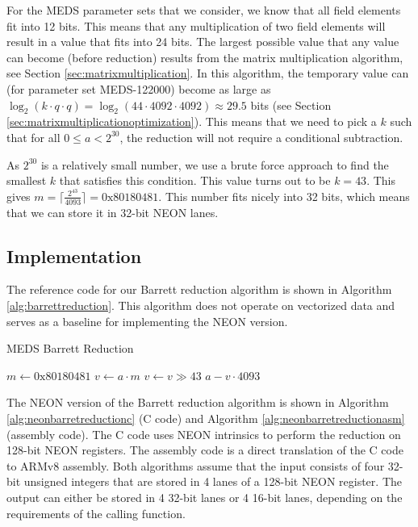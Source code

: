 \documentclass[11pt,a4paper]{report}
\theoremstyle{definition}
\begin{document}
For the MEDS parameter sets that we consider, we know that all field elements fit into 12 bits. This means that any multiplication of two field elements will result in a value that fits into 24 bits. The largest possible value that any value can become (before reduction) results from the matrix multiplication algorithm, see Section \ref{sec:matrixmultiplication}. In this algorithm, the temporary value can (for parameter set MEDS-122000) become as large as $\log_2(k \cdot q \cdot q) = \log_2(44 \cdot 4092 \cdot 4092) \approx 29.5$ bits (see Section \ref{sec:matrixmultiplicationoptimization}). This means that we need to pick a $k$ such that for all $0 \leq a < 2^{30}$, the reduction will not require a conditional subtraction.

As $2^{30}$ is a relatively small number, we use a brute force approach to find the smallest $k$ that satisfies this condition. This value turns out to be $k = 43$. This gives $m = \lceil \frac{2^{43}}{4093} \rceil = 0\text{x}80180481$. This number fits nicely into 32 bits, which means that we can store it in 32-bit NEON lanes.

\subsection{Implementation}
The reference code for our Barrett reduction algorithm is shown in Algorithm \ref{alg:barrettreduction}. This algorithm does not operate on vectorized data and serves as a baseline for implementing the NEON version.

\begin{algorithm}
  \caption{MEDS Barrett Reduction}
  \label{alg:barrettreduction}
  \begin{algorithmic}
      \State $m \gets 0\text{x}80180481$
      \State $v \gets a \cdot m$
      \State $v \gets v \gg 43$
      \State \Return $a - v \cdot 4093$
    \EndFunction
  \end{algorithmic}
\end{algorithm}

The NEON version of the Barrett reduction algorithm is shown in Algorithm \ref{alg:neonbarretreductionc} (C code) and Algorithm \ref{alg:neonbarretreductionasm} (assembly code). The C code uses NEON intrinsics to perform the reduction on 128-bit NEON registers. The assembly code is a direct translation of the C code to ARMv8 assembly. Both algorithms assume that the input consists of four 32-bit unsigned integers that are stored in 4 lanes of a 128-bit NEON register. The output can either be stored in 4 32-bit lanes or 4 16-bit lanes, depending on the requirements of the calling function.
\end{document}
